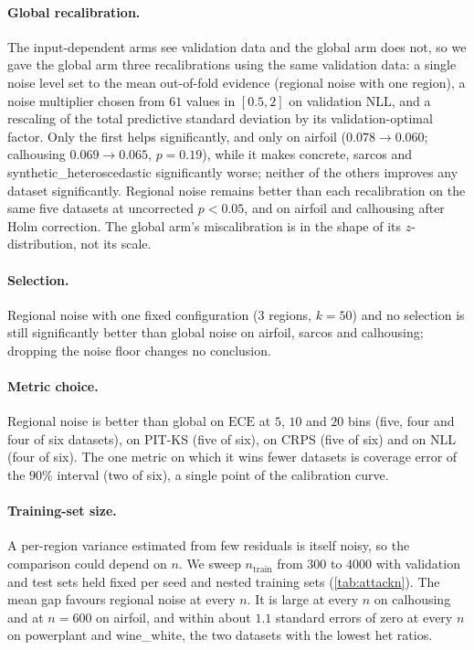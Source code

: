 \documentclass[11pt]{article}
\newcommand{\ece}{\mathrm{ECE}}
\begin{document}
\paragraph{Global recalibration.} The input-dependent arms see validation data and the
global arm does not, so we gave the global arm three recalibrations using the same
validation data: a single noise level set to the mean out-of-fold evidence (regional
noise with one region), a noise multiplier chosen from $61$ values in $[0.5, 2]$ on
validation NLL, and a rescaling of the total predictive standard deviation by its
validation-optimal factor. Only the first helps significantly, and only on airfoil
($0.078 \to 0.060$; calhousing $0.069 \to 0.065$, $p=0.19$), while it makes concrete,
sarcos and synthetic\_heteroscedastic significantly worse; neither of the others
improves any dataset significantly. Regional noise remains better than each
recalibration on the same five datasets at uncorrected $p<0.05$, and on airfoil and
calhousing after Holm correction. The global arm's miscalibration is in
the shape of its $z$-distribution, not its scale.

\paragraph{Selection.} Regional noise with one fixed configuration ($3$ regions,
$k=50$) and no selection is still significantly better than global noise on airfoil,
sarcos and calhousing; dropping the noise floor changes no conclusion.

\paragraph{Metric choice.} Regional noise is better than global on $\ece$ at $5$, $10$
and $20$ bins (five, four and four of six datasets), on PIT-KS (five of six), on CRPS
(five of six) and on NLL (four of six). The one metric on which it wins fewer
datasets is coverage error of the $90\%$ interval (two of six), a single point of the
calibration curve.

\paragraph{Training-set size.} A per-region variance estimated from few residuals is
itself noisy, so the comparison could depend on $n$. We sweep $n_{\text{train}}$ from
$300$ to $4000$ with validation and test sets held fixed per seed and nested training
sets (\cref{tab:attackn}). The mean gap favours regional noise at every $n$. It is
large at every $n$ on calhousing and at $n=600$ on airfoil, and within about $1.1$
standard errors of zero at every $n$ on powerplant and wine\_white, the two datasets
with the lowest het ratios.
\end{document}
